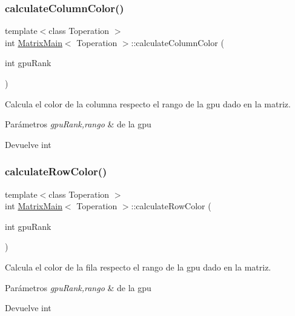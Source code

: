 \subsubsection{\texorpdfstring{calculate\+Column\+Color()}{calculateColumnColor()}}
{\footnotesize\ttfamily template$<$class Toperation $>$ \\
int \hyperlink{classMatrixMain}{Matrix\+Main}$<$ Toperation $>$\+::calculate\+Column\+Color (\begin{DoxyParamCaption}\item[{int}]{gpu\+Rank }\end{DoxyParamCaption})}



Calcula el color de la columna respecto el rango de la gpu dado en la matriz. 


\begin{DoxyParams}{Parámetros}
{\em gpu\+Rank,rango} & de la gpu \\
\hline
\end{DoxyParams}
\begin{DoxyReturn}{Devuelve}
int 
\end{DoxyReturn}
\mbox{\label{classMatrixMain_aa45d7ed84d54e7ff0f78898fe6441915}} 
\subsubsection{\texorpdfstring{calculate\+Row\+Color()}{calculateRowColor()}}
{\footnotesize\ttfamily template$<$class Toperation $>$ \\
int \hyperlink{classMatrixMain}{Matrix\+Main}$<$ Toperation $>$\+::calculate\+Row\+Color (\begin{DoxyParamCaption}\item[{int}]{gpu\+Rank }\end{DoxyParamCaption})}



Calcula el color de la fila respecto el rango de la gpu dado en la matriz. 


\begin{DoxyParams}{Parámetros}
{\em gpu\+Rank,rango} & de la gpu \\
\hline
\end{DoxyParams}
\begin{DoxyReturn}{Devuelve}
int 
\end{DoxyReturn}
\mbox{\label{classMatrixMain_a300c5ebe0494dde69fe7b8bc3a63ad0b}} 
